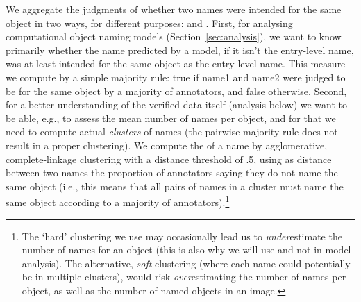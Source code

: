 We aggregate the judgments of whether two names were intended for the same object in two ways, for different purposes: \sameobject and \cluster.
First, for analysing computational object naming models (Section~\ref{sec:analysis}), 
we want to know primarily whether the name predicted by a model, if it isn't the entry-level name, was at least intended for the same object as the entry-level name.
This \textbf{\sameobject} measure we compute by a simple majority rule: true if name1 and name2 were judged to be for the same object by a majority of annotators, and false otherwise.
Second, for a better understanding of the verified \mn data itself (analysis below) we want to be able, e.g., to assess the mean number of names per object, and for that we need to compute actual \emph{clusters} of names (the pairwise majority rule does not result in a proper clustering). 
We compute the \textbf{\cluster} of a name by agglomerative, complete-linkage clustering with a distance threshold of .5, using as distance between two names the proportion of annotators saying they do not name the same object (i.e., this means that all pairs of names in a cluster must name the same object according to a majority of annotators).\footnote{
	The `hard' clustering we use may occasionally lead us to \emph{under}estimate the number of names for an object (this is also why we will use \sameobject and not \cluster in model analysis). The alternative, \emph{soft} clustering (where each name could potentially be in multiple clusters), would risk \emph{over}estimating the number of names per object, as well as the number of named objects in an image.
}





